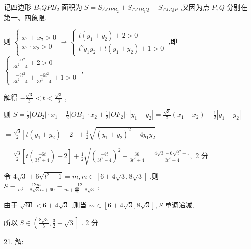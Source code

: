 \documentclass[10pt]{article}
\begin{document}
记四边形 \({B}_{1}{QP}{B}_{2}\) 面积为 \(S = {S}_{\bigtriangleup {OP}{B}_{2}} + {S}_{\bigtriangleup O{B}_{1}Q} + {S}_{\bigtriangleup {OQP}}\) ,又因为点 \(P,Q\) 分别在第一、四象限,

则 \(\left\{  {\begin{array}{l} {x}_{1} + {x}_{2} > 0 \\  {x}_{1} \cdot  {x}_{2} > 0 \end{array} \Rightarrow  \left\{  \begin{array}{l} t\left( {{y}_{1} + {y}_{2}}\right)  + 2 > 0 \\  {t}^{2}{y}_{1}{y}_{2} + t\left( {{y}_{1} + {y}_{2}}\right)  + 1 > 0 \end{array}\right. }\right.\) ,即 \(\left\{  \begin{array}{l} \frac{-6{t}^{2}}{3{t}^{2} + 4} + 2 > 0 \\  \frac{-9{t}^{2}}{3{t}^{2} + 4} + \frac{-6{t}^{2}}{3{t}^{2} + 4} + 1 > 0 \end{array}\right.\) ,

解得 \(- \frac{\sqrt{3}}{3} < t < \frac{\sqrt{3}}{3}\) ,

则 \(S = \frac{1}{2}\left| {O{B}_{2}}\right|  \cdot  {x}_{1} + \frac{1}{2}\left| {O{B}_{1}}\right|  \cdot  {x}_{2} + \frac{1}{2}\left| {O{F}_{2}}\right|  \cdot  \left| {{y}_{1} - {y}_{2}}\right|  = \frac{\sqrt{3}}{2}\left( {{x}_{1} + {x}_{2}}\right)  + \frac{1}{2}\left| {{y}_{1} - {y}_{2}}\right|\)

\(= \frac{\sqrt{3}}{2}\left\lbrack  {t\left( {{y}_{1} + {y}_{2}}\right)  + 2}\right\rbrack   + \frac{1}{2}\sqrt{{\left( {y}_{1} + {y}_{2}\right) }^{2} - 4{y}_{1}{y}_{2}}\)

\(= \frac{\sqrt{3}}{2}\left\lbrack  {t\left( \frac{-{6t}}{3{t}^{2} + 4}\right)  + 2}\right\rbrack   + \frac{1}{2}\sqrt{{\left( \frac{-{6t}}{3{t}^{2} + 4}\right) }^{2} + \frac{36}{3{t}^{2} + 4}} = \frac{4\sqrt{3} + 6\sqrt{{t}^{2} + 1}}{3{t}^{2} + 4},\) 2 分

令 \(4\sqrt{3} + 6\sqrt{{t}^{2} + 1} = m,m \in  \left\lbrack  {6 + 4\sqrt{3},8\sqrt{3}}\right\rbrack\) ,则 \(S = \frac{12m}{{m}^{2} - 8\sqrt{3}m + {60}} = \frac{12}{m + \frac{60}{m} - 8\sqrt{3}}\) ,

由于 \(\sqrt{60} < 6 + 4\sqrt{3}\) ,则当 \(m \in  \left\lbrack  {6 + 4\sqrt{3},8\sqrt{3}}\right\rbrack  ,S\) 单调递减,

所以 \(S \in  \left( {\frac{8\sqrt{3}}{5},\frac{3}{2} + \sqrt{3}}\right\rbrack\) . 2 分

21. 解:
\end{document}
